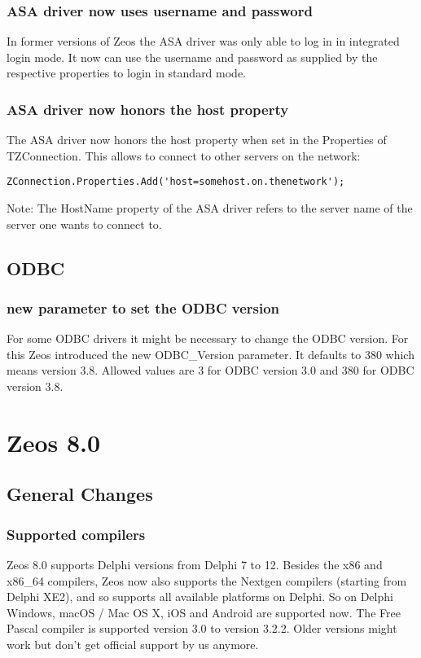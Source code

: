 \documentclass[a4paper,12pt,oneside]{report}
\begin{document}
\subsection{ASA driver now uses username and password}
In former versions of Zeos the ASA driver was only able to log in in integrated login mode.
It now can use the username and password as supplied by the respective properties to login in standard mode.

\subsection{ASA driver now honors the host property}
The ASA driver now honors the host property when set in the Properties of TZConnection.
This allows to connect to other servers on the network:

\begin{lstlisting}
ZConnection.Properties.Add('host=somehost.on.thenetwork');
\end{lstlisting}

Note: The HostName property of the ASA driver refers to the server name of the server one wants to connect to.

\section{ODBC}
\subsection{new parameter to set the ODBC version}
For some ODBC drivers it might be necessary to change the ODBC version.
For this Zeos introduced the new ODBC\_Version parameter.
It defaults to 380 which means version 3.8.
Allowed values are 3 for ODBC version 3.0 and 380 for ODBC version 3.8.

\chapter{Zeos 8.0}

\section{General Changes}
\label{sec:GeneralChanges}
\subsection{Supported compilers}
\label{sec:GeneralChanges_SupportedCompilers}
Zeos 8.0 supports Delphi versions from Delphi 7 to 12.
Besides the x86 and x86\_64 compilers, Zeos now also supports the Nextgen compilers (starting from Delphi XE2), and so supports all available platforms on Delphi.
So on Delphi Windows, macOS / Mac OS X, iOS and Android are supported now.
The Free Pascal compiler is supported version 3.0 to version 3.2.2.
Older versions might work but don't get official support by us anymore.
\end{document}
